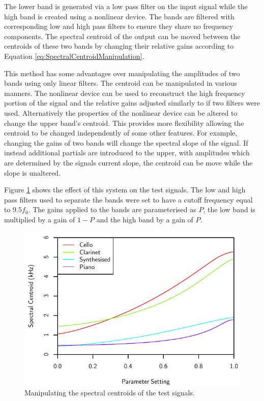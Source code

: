 			The lower band is generated via a low pass filter on the input signal while the high band is
			created using a nonlinear device. The bands are filtered with corresponding low and high pass
			filters to ensure they share no frequency components. The spectral centroid of the output can be
			moved between the centroids of these two bands by changing their relative gains according to
			Equation \ref{eq:SpectralCentroidManipulation}.

			This method has some advantages over manipulating the amplitudes of two bands using only linear
			filters. The centroid can be manipulated in various manners. The nonlinear device can be used to
			reconstruct the high frequency portion of the signal and the relative gains adjusted similarly to
			if two filters were used.  Alternatively the properties of the nonlinear device can be altered to
			change the upper band's centroid. This provides more flexibility allowing the centroid to be
			changed independently of some other features. For example, changing the gains of two bands will
			change the spectral slope of the signal. If instead additional partials are introduced to the
			upper, with amplitudes which are determined by the signals current slope, the centroid can be move
			while the slope is unaltered.

			Figure \ref{fig:MoveCentroids} shows the effect of this system on the test signals. The low and
			high pass filters used to separate the bands were set to have a cutoff frequency equal to
			$9.5f_{0}$. The gains applied to the bands are parameterised as $P$, the low band is multiplied by
			a gain of $1 - P$ and the high band by a gain of $P$.

			\begin{figure}[h!]
				\centering
				\includegraphics{chapter6/Images/MoveCentroids.pdf}
				\caption{Manipulating the spectral centroids of the test signals.}
				\label{fig:MoveCentroids}
			\end{figure}

